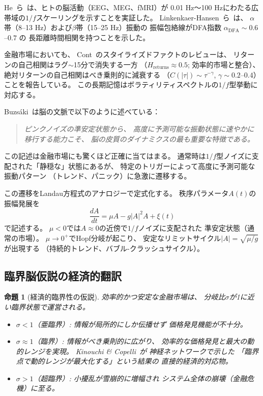 \documentclass[12pt,twocolumn]{ltjsarticle}
\newtheorem{proposition}[theorem]{命題}
\begin{document}
He~ら~\cite{He2010}は、ヒトの脳活動（EEG、MEG、fMRI）が
0.01 Hz〜100 Hzにわたる広帯域の$1/f$スケーリングを示すことを実証した。
Linkenkaer-Hansen~ら~\cite{Linkenkaer2001}は、
$\alpha$帯（8--13 Hz）および$\beta$帯（15--25 Hz）振動の
振幅包絡線がDFA指数 $\alpha_{\text{DFA}} \sim 0.6$--$0.7$ の
長距離時間相関を持つことを示した。

金融市場においても、
Cont~\cite{Cont2001}のスタイライズドファクトのレビューは、
リターンの自己相関はラグ$\sim$15分で消失する一方
（$H_{\text{returns}} \approx 0.5$; 効率的市場と整合）、
絶対リターンの自己相関はべき乗則的に減衰する
（$C(|\tau|) \sim \tau^{-\gamma}$, $\gamma \sim 0.2$--$0.4$）
ことを報告している。
この長期記憶はボラティリティスペクトルの$1/f$型挙動に対応する。

Buzs\'{a}ki~\cite{Buzsaki2006}は脳の文脈で以下のように述べている：

\begin{quote}
\emph{ピンクノイズの準安定状態から、
高度に予測可能な振動状態に速やかに移行する能力こそ、
脳の皮質のダイナミクスの最も重要な特徴である。}
\end{quote}

この記述は金融市場にも驚くほど正確に当てはまる。
通常時は$1/f$型ノイズに支配された「静穏な」状態にあるが、
特定のトリガーによって高度に予測可能な振動パターン
（トレンド、パニック）に急激に遷移する。

この遷移をLandau方程式のアナロジーで定式化する。
秩序パラメータ$A(t)$の振幅発展を
\begin{equation}
\frac{dA}{dt} = \mu A - g|A|^2 A + \xi(t)
\label{eq:landau}
\end{equation}
で記述する。
$\mu < 0$では$A \approx 0$の近傍で$1/f$ノイズに支配された
準安定状態（通常の市場）。
$\mu \to 0^+$でHopf分岐が起こり、
安定なリミットサイクル$|A| = \sqrt{\mu/g}$が出現する
（持続的トレンド、バブル-クラッシュサイクル）。

\subsection{臨界脳仮説の経済的翻訳}

\begin{proposition}[経済的臨界性の仮説]
\label{prop:criticality}
効率的かつ安定な金融市場は、
分岐比$\sigma$が1に近い臨界状態で運営される。
\begin{itemize}
\item $\sigma < 1$（亜臨界）: 情報が局所的にしか伝播せず
価格発見機能が不十分。
\item $\sigma \approx 1$（臨界）: 情報がべき乗則的に広がり、
効率的な価格発見と最大の動的レンジを実現。
Kinouchi \& Copelli~\cite{Kinouchi2006}が
神経ネットワークで示した
「臨界点で動的レンジが最大化する」という結果の
直接的経済的対応物。
\item $\sigma > 1$（超臨界）: 小擾乱が雪崩的に増幅され
システム全体の崩壊（金融危機）に至る。
\end{itemize}
\end{proposition}
\end{document}
